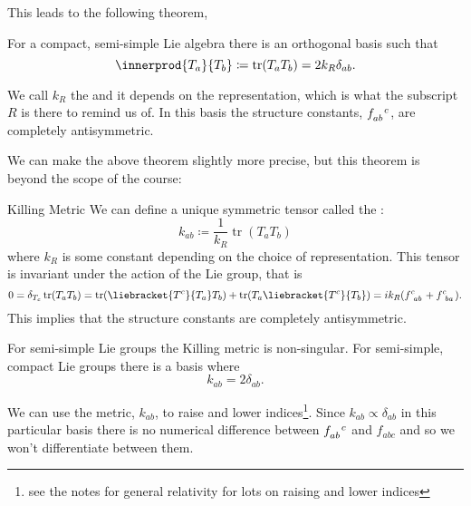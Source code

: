 \documentclass[fleqn]{NotesClass}
\DeclareMathOperator{\tr}{tr}
\begin{document}
    This leads to the following theorem,
    \begin{thm}{}{}
        For a compact, semi-simple Lie algebra there is an orthogonal basis such that
        \begin{equation}
            \innerprod{T_a}{T_b} \coloneqq \tr(T_aT_b) = 2k_{R}\delta_{ab}.
        \end{equation}
    \end{thm}
    We call \(k_R\) the  and it depends on the representation, which is what the subscript \(R\) is there to remind us of.
    In this basis the structure constants, \(\tensor{f}{_{ab}^c}\), are completely antisymmetric.
    
    We can make the above theorem slightly more precise, but this theorem is beyond the scope of the course:
    \begin{thm}{Killing Metric}{}
        We can define a unique symmetric tensor called the :
        \begin{equation}
            k_{ab} \coloneqq \frac{1}{k_R} \tr(T_aT_b)
        \end{equation}
        where \(k_R\) is some constant depending on the choice of representation.
        This tensor is invariant under the action of the Lie group, that is
        \begin{equation}
            0 = \delta_{T_c} \tr(T_aT_b) = \tr(\liebracket{T^c}{T_a}T_b) + \tr(T_a\liebracket{T^c}{T_b}) = ik_R(\tensor{f}{^c_{ab}} + \tensor{f}{^c_{ba}}).
        \end{equation}
        This implies that the structure constants are completely antisymmetric.
        
        For semi-simple Lie groups the Killing metric is non-singular.
        For semi-simple, compact Lie groups there is a basis where
        \begin{equation}
            k_{ab} = 2\delta_{ab}.
        \end{equation}
    \end{thm}

    We can use the metric, \(k_{ab}\), to raise and lower indices\footnote{see the notes for general relativity for lots on raising and lower indices}.
    Since \(k_{ab} \propto \delta_{ab}\) in this particular basis there is no numerical difference between \(\tensor{f}{_{ab}^c}\) and \(f_{abc}\) and so we won't differentiate between them.
    
\end{document}
